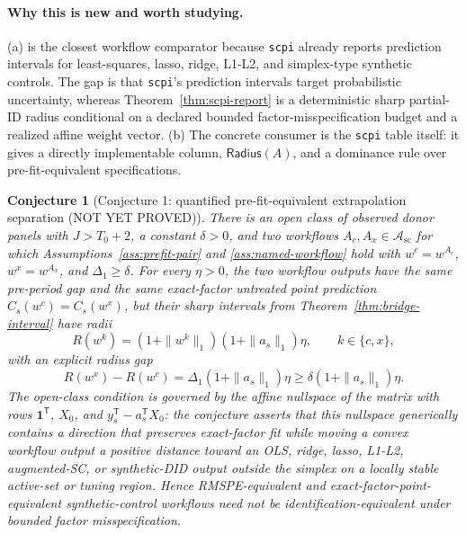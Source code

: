 \documentclass[11pt]{article}
\newcommand{\one}{\mathbf{1}}
\newcommand{\transpose}{\mathsf{T}}
\theoremstyle{definition}
\theoremstyle{plain}
\newtheorem{conjecture}{Conjecture}
\theoremstyle{remark}
\begin{document}
\paragraph{Why this is new and worth studying.}
(a) \citet{CattaneoFengPalombaTitiunik2025JSS} is the closest workflow comparator because \texttt{scpi} already reports prediction intervals for least-squares, lasso, ridge, L1-L2, and simplex-type synthetic controls. The gap is that \texttt{scpi}'s prediction intervals target probabilistic uncertainty, whereas Theorem~\ref{thm:scpi-report} is a deterministic sharp partial-ID radius conditional on a declared bounded factor-misspecification budget and a realized affine weight vector. (b) The concrete consumer is the \texttt{scpi} table itself: it gives a directly implementable column, \(\mathsf{Radius}(A)\), and a dominance rule over pre-fit-equivalent specifications.

\begin{conjecture}[Conjecture 1: quantified pre-fit-equivalent extrapolation separation (NOT YET PROVED)]\label{conj:prefit-equivalent-separation}
There is an open class of observed donor panels with \(J>T_0+2\), a constant \(\delta>0\), and two workflows \(A_c,A_x\in\mathcal{A}_{\mathrm{sc}}\) for which Assumptions~\ref{ass:prefit-pair} and \ref{ass:named-workflow} hold with \(w^c=w^{A_c}\), \(w^x=w^{A_x}\), and \(\Delta_1\ge\delta\). For every \(\eta>0\), the two workflow outputs have the same pre-period gap and the same exact-factor untreated point prediction \(C_s(w^c)=C_s(w^x)\), but their sharp intervals from Theorem~\ref{thm:bridge-interval} have radii
\[
R(w^k)= (1+\|w^k\|_1)(1+\|a_s\|_1)\eta,\qquad k\in\{c,x\},
\]
with an explicit radius gap
\[
R(w^x)-R(w^c)=\Delta_1(1+\|a_s\|_1)\eta\ge\delta(1+\|a_s\|_1)\eta.
\]
The open-class condition is governed by the affine nullspace of the matrix with rows \(\one^\transpose\), \(X_0\), and \(y_s^\transpose-a_s^\transpose X_0\): the conjecture asserts that this nullspace generically contains a direction that preserves exact-factor fit while moving a convex workflow output a positive distance toward an OLS, ridge, lasso, L1-L2, augmented-SC, or synthetic-DID output outside the simplex on a locally stable active-set or tuning region. Hence RMSPE-equivalent and exact-factor-point-equivalent synthetic-control workflows need not be identification-equivalent under bounded factor misspecification.
\end{conjecture}
\end{document}
